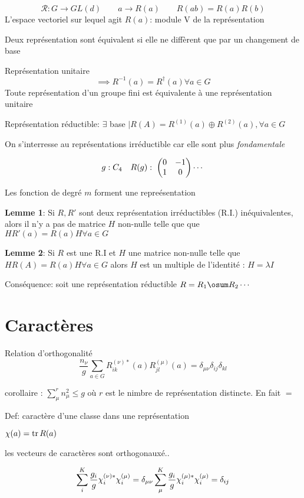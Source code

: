 $$\mathcal{R}: G \to GL(d) \qquad a\to R(a) \qquad R(ab) = R(a)R(b)$$
L'espace vectoriel sur lequel agit $R(a)$: module V de la représentation

Deux représentation sont équivalent si elle ne diffèrent que par un changement de base

Représentation unitaire \[
	\implies R^{-1}(a) = R^{\dagger}(a) \forall a \in G

\]
Toute représentation d'un groupe fini est équivalente à une  représentation unitaire

Représentation réductible: $\exists$ base $| R(A)= R^{(1)}(a) \oplus R^{(2)}(a), \forall a \in G$

On s'interresse au représentations irréductible car elle sont plus {\it fondamentale}

\begin{tcolorbox}[title=Exemple: $C_4$ et base des vecteurs x,y]

	$$g: C_4 \quad R(g):\; \begin{pmatrix} 0 & -1 \\ 1 &0 \end{pmatrix} \dotsb $$
	 
	Les fonction de degré $m$ forment une repreésentation
\end{tcolorbox}


{\bf Lemme 1}: Si $R, R'$ sont deux représentation irréductibles (R.I.) inéquivalentes, alors il n'y a pas de matrice $H$ non-nulle telle que que $HR'(a) = R(a)H \forall a \in G$


{\bf Lemme 2}: Si $R$ est une R.I et $H$ une matrice non-nulle telle que $H R(A) = R(a)H \forall a \in G$ alors $H$ est un multiple de l'identité : $H = \lambda I$

Conséquence: soit une représentation réductible $R =R_1 \osum  R_2 \dotsb$

\section*{Caractères}

Relation d'orthogonalité
\[
	\frac{n_\nu}{g} \sum_{a\in G} R_{ik}^{(\nu)*} (a) R_{jl}^{(\mu)}(a) = \delta_{\mu\nu}\delta_{ij}\delta_{kl}
\]

corollaire : $\sum_\mu^r n_\mu^2 \leq g$ où $r$ est le nimbre de représentation distincte. En fait $=$ 

Def: caractère d'une classe dans une représentation

$\chi(a) = \tr R(a)$


les vecteurs de caractères sont orthogonauxé..

\[
	\sum_i^K \frac{g_i}{g} \chi_i^{(\nu)*}\chi_i^{(\mu)} = \delta_{\mu\nu}\\
	\sum_\mu^K \frac{g_i}{g} \chi_i^{(\mu)*}\chi_i^{(\mu)} = \delta_{ij}
\]




